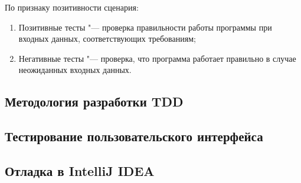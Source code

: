 По признаку позитивности сценария:
\begin{enumerate}
  \item Позитивные тесты "--- проверка правильности работы программы при входных данных, соответствующих требованиям;
  \item Негативные тесты "--- проверка, что программа работает правильно в случае неожиданных входных данных.
\end{enumerate}

\subsection{Методология разработки TDD}
\label{subsec:testing:tdd}

\subsection{Тестирование пользовательского интерфейса}
\label{subsec:testing:ui}

\subsection{Отладка в IntelliJ IDEA}
\label{subsec:debug}

\conclusions
\label{sec:techConclusions}
